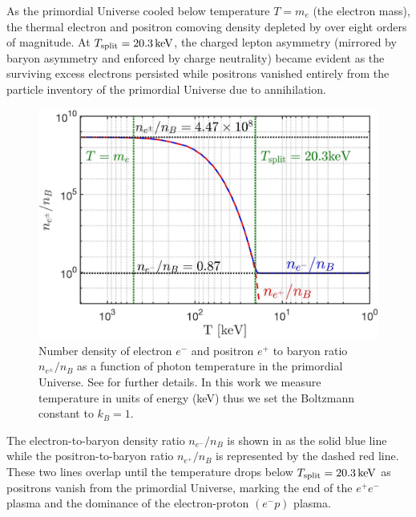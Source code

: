 As the primordial Universe cooled below temperature $T\!=\!m_{e}$ (the electron mass), the thermal electron and positron comoving density depleted by over eight orders of magnitude. At $T_\mathrm{split}=20.3\text{\,keV}$, the charged lepton asymmetry (mirrored by baryon asymmetry and enforced by charge neutrality) became evident as the surviving excess electrons persisted while positrons vanished entirely from the particle inventory of the primordial Universe due to annihilation.

\begin{figure}
 \centering
\includegraphics[width=0.80\linewidth]{plots/EEPlasmaDensityRatio_new01.jpg}
 \caption{Number density of electron $e^{-}$ and positron $e^{+}$ to baryon ratio $n_{e^{\pm}}/n_{B}$ as a function of photon temperature in the primordial Universe. See  for further details. In this work we measure temperature in units of energy (keV) thus we set the Boltzmann constant to $k_{B}=1$. }
 \label{fig:densityratio} 
\end{figure}

The electron-to-baryon density ratio $n_{e^{-}}/n_{B}$ is shown in  as the solid blue line while the positron-to-baryon ratio $n_{e^{+}}/n_{B}$ is represented by the dashed red line. These two lines overlap until the temperature drops below $T_\mathrm{split}=20.3\text{\,keV}$ as positrons vanish from the primordial Universe, marking the end of the $e^{+}e^{-}$ plasma and the dominance of the electron-proton $(e^{-}p)$ plasma. 

